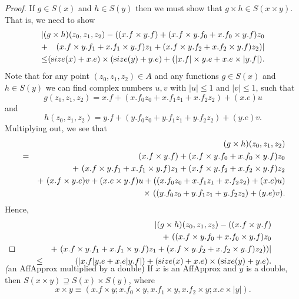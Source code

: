 \begin{proof}{}  If $g \in S(x)$ and $h \in S(y)$ then we must show that $g\times h \in S(x \times y).$  That is, we need to show
\begin{eqnarray*}
&&\hskip-.25in |(g \times h)(z_0,z_1,z_2)   - 
((x.f \times y.f) + 
(x.f \times y.f_0 + x.f_0 \times y.f) z_0 \\
&\hskip-8pt+\hskip-8pt& (x.f \times y.f_1 + x.f_1 \times y.f) z_1 + (x.f \times y.f_2 + x.f_2 \times y.f) z_2)| 
\\
\le&\hskip-8pt\hskip-8pt&\hskip-16pt ({\textrm size}(x) + x.e) \times ({\textrm size}(y) + y.e) + (|x.f| \times y.e + x.e \times |y.f|).
\end{eqnarray*}
Note that for any point $(z_0, z_1, z_2) \in A$ and any functions $g \in S(x)$ and $h \in S(y)$ we can find complex numbers $u, v$ with
$|u| \le 1$ and $|v| \le 1$, such that
$$ g(z_0, z_1, z_2) = x.f + (x.f_0 z_0 + x.f_1 z_1 + x.f_2 z_2) + (x.e) u$$ and 
$$ h(z_0, z_1, z_2) = y.f + (y.f_0 z_0 + y.f_1 z_1 + y.f_2 z_2) + (y.e) v.$$
Multiplying out, we see that 
\begin{eqnarray*}
&&\hskip-36pt(g \times h) (z_0, z_1, z_2)\\
& = &
(x.f \times y.f) + 
(x.f \times y.f_0 + x.f_0 \times y.f) z_0\\
&& +\ (x.f \times y.f_1 + x.f_1 \times y.f) z_1 +
(x.f \times y.f_2 + x.f_2 \times y.f) z_2\\&& + \
(x.f \times y.e) v + (x.e \times y.f) u + 
((x.f_0 z_0 + x.f_1 z_1 + x.f_2 z_2) + (x.e) u)\\
&& \times\
((y.f_0 z_0 + y.f_1 z_1 + y.f_2 z_2) + (y.e) v).
                                              \end{eqnarray*}
Hence,
\begin{eqnarray*}
&&\hskip-48pt |(g \times h) (z_0, z_1, z_2) - ((x.f \times y.f) \\
& & + \
((x.f \times y.f_0 + x.f_0 \times y.f) z_0\\
&& +\ (x.f \times y.f_1 + x.f_1 \times y.f) z_1 +
(x.f \times y.f_2 + x.f_2 \times y.f) z_2))|
 \\
&\le& (|x.f| y.e + x.e |y.f|) + 
({\textrm size}(x) + x.e) \times ({\textrm size}(y) + y.e).\\
\noalign{\vskip-36pt}
\end{eqnarray*}
\end{proof}

\begin{proposition}{\label{GMT prop6.7} {\textit (an AffApprox multiplied by a double)}}
If $x$ is an {\textrm AffApprox}  and $y$ is a double{\textrm ,} then $S(x \times y) \supseteq S(x) \times S(y)${\textrm ,} where
$$ x \times y \equiv (x.f \times y;  x.f_0 \times y, 
x.f_1 \times y,  x.f_2 \times y; 
x.e \times |y|). $$
\end{proposition}

